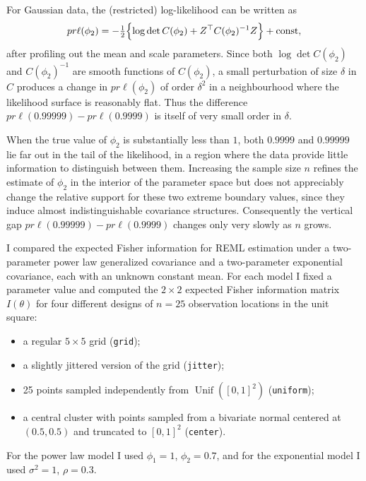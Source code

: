 \documentclass[answers,12pt,addpoints]{exam}
\begin{document}
\begin{questions}
\begin{remark}
\begin{solution}
For Gaussian data, the (restricted) log-likelihood can be written as
\[
pr\ell(\phi_2)
= -\tfrac{1}{2}\Bigl\{\log\det C(\phi_2)
   + Z^\top C(\phi_2)^{-1} Z\Bigr\} + \text{const},
\]
after profiling out the mean and scale parameters.  Since both
$\log\det C(\phi_2)$ and $C(\phi_2)^{-1}$ are smooth functions of
$C(\phi_2)$, a small perturbation of size $\delta$ in $C$ produces a
change in $pr\ell(\phi_2)$ of order $\delta^2$ in a neighbourhood where
the likelihood surface is reasonably flat.  Thus the difference
$pr\ell(0.99999) - pr\ell(0.9999)$ is itself of very small order in
$\delta$.

When the true value of $\phi_2$ is substantially less than $1$, both
$0.9999$ and $0.99999$ lie far out in the tail of the likelihood, in a
region where the data provide little information to distinguish between
them.  Increasing the sample size $n$ refines the estimate of $\phi_2$
in the interior of the parameter space but does not appreciably change
the relative support for these two extreme boundary values, since they
induce almost indistinguishable covariance structures.  Consequently
the vertical gap $pr\ell(0.99999)-pr\ell(0.9999)$ changes only very
slowly as $n$ grows. 
\end{solution}


\end{remark}





\begin{solution}
I compared the expected Fisher
information for REML estimation under a two-parameter power law
generalized covariance and a two-parameter exponential covariance,
each with an unknown constant mean.  For each model I fixed a
parameter value and computed the $2\times2$ expected Fisher
information matrix $I(\theta)$ for four different designs of $n=25$
observation locations in the unit square:
\begin{itemize}
\item a regular $5\times5$ grid (\texttt{grid});
\item a slightly jittered version of the grid (\texttt{jitter});
\item 25 points sampled independently from $\operatorname{Unif}([0,1]^2)$
(\texttt{uniform});
\item a central cluster with points sampled from a bivariate normal
centered at $(0.5,0.5)$ and truncated to $[0,1]^2$ (\texttt{center}).
\end{itemize}
For the power law model I used $\phi_1=1$, $\phi_2=0.7$, and for the
exponential model I used $\sigma^2=1$, $\rho=0.3$.


\end{solution}
\end{questions}
\end{document}
